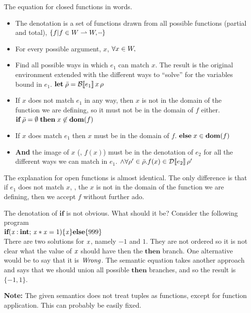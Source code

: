 The equation for closed functions in words.
\begin{itemize}
\item The denotation is a set of functions drawn from all possible functions (partial and total),
  $\{ f | f \in \semfcn, \mydots \}$
\item For every possible argument, $x$, $\forall x \in W,$
\item Find all possible ways in which $e_1$ can match $x$.  The result is the original environment
  extended with the different ways to ``solve'' for the variables bound in $e_1$.
  $ \mathbf{let}\; \bar{\rho} = \mathcal{B}\llbracket e_1 \rrbracket\, x \, \rho $
\item If $x$ does not match $e_1$ in any way, then $x$ is not in the domain of the function we are defining,
  so it must not be in the domain of $f$ either.
  $\textbf{if}\; \bar{\rho} = \emptyset\; \textbf{then}\; x \not\in \mathbf{dom}(f)$
\item If $x$ does match $e_1$ then $x$ must be in the domain of $f$.
  $ \textbf{else}\; x \in \mathbf{dom}(f) $
\item \textbf{And} the image of $x$ (\ie, $f(x)$) must be in the denotation of $e_2$
  for all the different ways we can match in $e_1$.
  $ \land \forall \rho' \in \bar{\rho}. f(x) \in \mathcal{D}\llbracket e_2 \rrbracket\, \rho' $
\end{itemize}

The explanation for open functions is almost identical.  The only difference is that if $e_1$ does not match $x$,
\ie, the $x$ is not in the domain of the function we are defining, then we accept $f$ without further ado.

The denotation of \ensuremath{\textbf{if}} is not obvious.  What should it be?
Consider the following program\\
\ensuremath{\textbf{if}(\Varid{x}\mathbin{:}\textbf{int};\,\Varid{x}\mathbin{*}\Varid{x}\mathrel{=}\mathrm{1})\{\Varid{x}\}\textbf{else}\{\mathrm{999}\}} \\
There are two solutions for \ensuremath{\Varid{x}}, namely $-1$ and $1$.
They are not ordered so it is not clear what the value of \ensuremath{\Varid{x}} should have then the \ensuremath{\textbf{then}} branch.
One alternative would be to say that it is \ensuremath{\Conid{Wrong}}.
The semantic equation takes another approach and says that we should union all possible \ensuremath{\textbf{then}} branches,
and so the result is $\{-1,1\}$.

\textbf{Note:} The given semantics does not treat tuples as functions, except for function application.
This can probably be easily fixed.


